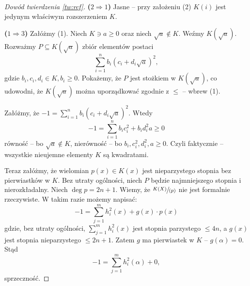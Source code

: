 \documentclass{article}
\theoremstyle{plain}
\theoremstyle{definition}
\theoremstyle{remark}
\begin{document}
\begin{proof}[Dowód twierdzenia \ref{tw:rcf}]

	\textbf{($2 \Rightarrow 1$)}
	Jasne -- przy założeniu (2) $K(i)$ jest jedynym właściwym rozszerzeniem
	$K$.

	\textbf{($1 \Rightarrow 3$)}
	Załóżmy (1). Niech $K \ni a \geq 0$ oraz niech
	$\sqrt{a} \notin K$. Weźmy $K(\sqrt{a})$. Rozważmy $P \subseteq
	K(\sqrt{a})$ zbiór elementów postaci
	\[
		\sum_{i=1}^{n} b_i (c_i + d_i \sqrt{a})^2,
	\]
	gdzie $b_i, c_i, d_i \in K, b_i \geq 0$. Pokażemy, że $P$ jest stożkiem
	w $K(\sqrt{a})$, co udowodni, że $K(\sqrt{a})$ można uporządkować
	zgodnie z $\leq$ -- wbrew (1).

	Załóżmy, że $-1 = \sum_{i=1}^n b_i (c_i + d_i \sqrt{a})^2$.%
	Wtedy
	$$ -1 = \sum_{i=1}^n b_i c_i^2 + b_i d_i^2 a \geq 0$$
	równość -- bo $\sqrt{a} \notin K$,
	nierówność -- bo $b_i, c_i^2, d_i^2, a \geq 0$.
	Czyli faktycznie -- wszystkie nieujemne elementy $K$ są kwadratami.

	Teraz załóżmy, że wielomian $p(x) \in K(x)$ jest nieparzystego stopnia
	bez pierwiastków w $K$. Bez utraty ogólności, niech $P$ będzie
	najmniejszego stopnia i nierozkładalny. %
	Niech $\deg p = 2n + 1$. Wiemy, że $\sfrac{K(X)}{(p)}$ nie jest
	formalnie rzeczywiste. W takim razie możemy napisać: %
	\[
		- 1 = \sum_{j=1}^m h_i^2(x) + g(x) \cdot p(x)
	\]
	gdzie, bez utraty ogólności, $\sum_{j=1}^m h_i^2(x)$ jest stopnia
	parzystego $\leq 4n$, a $g(x)$ jest stopnia nieparzystego $\leq 2n + 1$.
	Zatem $g$ ma pierwiastek w $K$ -- $g(\alpha) = 0$. Stąd
	\[
		- 1 = \sum_{j=1}^m h_i^2(\alpha) + 0,
	\]
	sprzeczność.


\end{proof}
\end{document}
